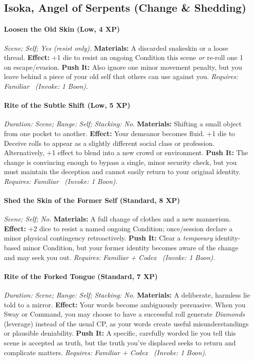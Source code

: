 \documentclass[12pt,twoside]{book}
\begin{document}
\subsection{Isoka, Angel of Serpents (Change \& Shedding)}
\paragraph{Loosen the Old Skin (Low, 4 XP)} \emph{Scene; Self; Yes (resist only).}
\textbf{Materials:} A discarded snakeskin or a loose thread.
\textbf{Effect:} +1 die to resist an ongoing Condition this scene \emph{or} re-roll one 1 on escape/evasion.
\textbf{Push It:} Also ignore one minor movement penalty, but you leave behind a piece of your old self that others can use against you.
\emph{Requires: Familiar \ (\textit{Invoke:} 1 Boon).}
\paragraph{Rite of the Subtle Shift (Low, 5 XP)} \emph{Duration: Scene; Range: Self; Stacking: No.}
\textbf{Materials:} Shifting a small object from one pocket to another.
\textbf{Effect:} Your demeanor becomes fluid. +1 die to Deceive rolls to appear as a slightly different social class or profession. Alternatively, +1 effect to blend into a new crowd or environment.
\textbf{Push It:} The change is convincing enough to bypass a single, minor security check, but you must maintain the deception and cannot easily return to your original identity.
\emph{Requires: Familiar \ (\textit{Invoke:} 1 Boon).}
\paragraph{Shed the Skin of the Former Self (Standard, 8 XP)} \emph{Scene; Self; No.}
\textbf{Materials:} A full change of clothes and a new mannerism.
\textbf{Effect:} +2 dice to resist a named ongoing Condition; once/session declare a minor physical contingency retroactively.
\textbf{Push It:} Clear a \emph{temporary} identity-based minor Condition, but your former identity becomes aware of the change and may seek you out.
\emph{Requires: Familiar + Codex \ (\textit{Invoke:} 1 Boon).}
\paragraph{Rite of the Forked Tongue (Standard, 7 XP)} \emph{Duration: Scene; Range: Self; Stacking: No.}
\textbf{Materials:} A deliberate, harmless lie told to a mirror.
\textbf{Effect:} Your words become ambiguously persuasive. When you Sway or Command, you may choose to have a successful roll generate \emph{Diamonds} (leverage) instead of the usual CP, as your words create useful misunderstandings or plausible deniability.
\textbf{Push It:} A specific, carefully worded lie you tell this scene is accepted as truth, but the truth you've displaced seeks to return and complicate matters.
\emph{Requires: Familiar + Codex \ (\textit{Invoke:} 1 Boon).}
\end{document}
